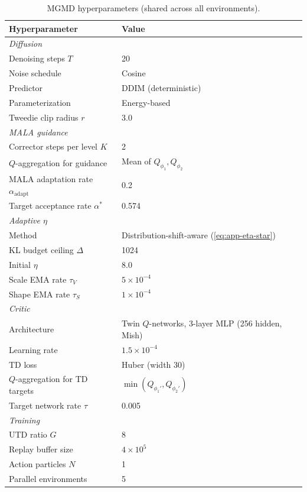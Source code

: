 \documentclass{article}
\theoremstyle{plain}
\theoremstyle{definition}
\theoremstyle{remark}
\begin{document}
\begin{table}[h]
  \caption{MGMD hyperparameters (shared across all environments).}
  \label{tab:hyperparams}
  \vskip 0.1in
  \centering
  \begin{small}
  \begin{tabular}{ll}
    \toprule
    \textbf{Hyperparameter} & \textbf{Value} \\
    \midrule
    \multicolumn{2}{l}{\textit{Diffusion}} \\
    Denoising steps $T$ & 20 \\
    Noise schedule & Cosine \\
    Predictor & DDIM (deterministic) \\
    Parameterization & Energy-based \\
    Tweedie clip radius $r$ & 3.0 \\
    \midrule
    \multicolumn{2}{l}{\textit{MALA guidance}} \\
    Corrector steps per level $K$ & 2 \\
    $Q$-aggregation for guidance & Mean of $Q_{\phi_1}, Q_{\phi_2}$ \\
    MALA adaptation rate $\alpha_{\text{adapt}}$ & 0.2 \\
    Target acceptance rate $\alpha^*$ & 0.574 \\
    \midrule
    \multicolumn{2}{l}{\textit{Adaptive $\eta$}} \\
    Method & Distribution-shift-aware (\cref{eq:app-eta-star}) \\
    KL budget ceiling $\Delta$ & 1024 \\
    Initial $\eta$ & 8.0 \\
    Scale EMA rate $\tau_V$ & $5 \times 10^{-4}$ \\
    Shape EMA rate $\tau_S$ & $1 \times 10^{-4}$ \\
    \midrule
    \multicolumn{2}{l}{\textit{Critic}} \\
    Architecture & Twin $Q$-networks, 3-layer MLP (256 hidden, Mish) \\
    Learning rate & $1.5 \times 10^{-4}$ \\
    TD loss & Huber (width 30) \\
    $Q$-aggregation for TD targets & $\min(Q_{\phi_1'}, Q_{\phi_2'})$ \\
    Target network rate $\tau$ & 0.005 \\
    \midrule
    \multicolumn{2}{l}{\textit{Training}} \\
    UTD ratio $G$ & 8 \\
    Replay buffer size & $4 \times 10^5$ \\
    Action particles $N$ & 1 \\
    Parallel environments & 5 \\
    \bottomrule
  \end{tabular}
  \end{small}
\end{table}
\end{document}
